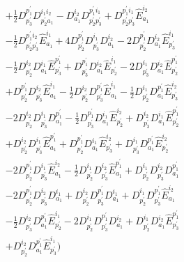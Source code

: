 \documentclass[aip,onecolumn,preprint]{revtex4-1}
\begin{document}
\begin{align}
  & + {{{\frac{1}{2}}}{D^{{p^{\prime}_1}}_{{p^{\prime}_3}}}{D^{{i_1}{i_2}}_{{p^{\prime}_2}{a_1}}}} - {{D^{{i_2}}_{{a_1}}}{D^{{p^{\prime}_1}{i_1}}_{{p^{\prime}_2}{p^{\prime}_3}}}} + {{D^{{p^{\prime}_1}{i_1}}_{{p^{\prime}_2}{p^{\prime}_3}}}{\hat{E}^{{i_2}}_{{a_1}}}} \nonumber \\
  & - {{{\frac{1}{2}}}{D^{{p^{\prime}_1}{i_2}}_{{p^{\prime}_2}{p^{\prime}_3}}}{\hat{E}^{{i_1}}_{{a_1}}}} + {{{4}}{D^{{p^{\prime}_1}}_{{p^{\prime}_2}}}{D^{{i_1}}_{{p^{\prime}_3}}}{D^{{i_2}}_{{a_1}}}} - {{{2}}{D^{{p^{\prime}_1}}_{{p^{\prime}_2}}}{D^{{i_2}}_{{a_1}}}{\hat{E}^{{i_1}}_{{p^{\prime}_3}}}} \nonumber \\
  & - {{{\frac{1}{2}}}{D^{{i_2}}_{{p^{\prime}_2}}}{D^{{i_1}}_{{a_1}}}{\hat{E}^{{p^{\prime}_1}}_{{p^{\prime}_3}}}}  + {{D^{{p^{\prime}_1}}_{{p^{\prime}_3}}}{D^{{i_2}}_{{a_1}}}{\hat{E}^{{i_1}}_{{p^{\prime}_2}}}} - {{{2}}{D^{{i_1}}_{{p^{\prime}_3}}}{D^{{i_2}}_{{a_1}}}{\hat{E}^{{p^{\prime}_1}}_{{p^{\prime}_2}}}} \nonumber \\
  & + {{D^{{p^{\prime}_1}}_{{p^{\prime}_2}}}{D^{{i_2}}_{{p^{\prime}_3}}}{\hat{E}^{{i_1}}_{{a_1}}}} - {{{\frac{1}{2}}}{D^{{i_2}}_{{p^{\prime}_2}}}{D^{{p^{\prime}_1}}_{{p^{\prime}_3}}}{\hat{E}^{{i_1}}_{{a_1}}}} - {{{\frac{1}{2}}}{D^{{i_1}}_{{p^{\prime}_2}}}{D^{{p^{\prime}_1}}_{{a_1}}}{\hat{E}^{{i_2}}_{{p^{\prime}_3}}}} \nonumber \\
  & - {{{2}}{D^{{i_2}}_{{p^{\prime}_2}}}{D^{{i_1}}_{{p^{\prime}_3}}}{D^{{p^{\prime}_1}}_{{a_1}}}} - {{{\frac{1}{2}}}{D^{{p^{\prime}_1}}_{{p^{\prime}_3}}}{D^{{i_1}}_{{a_1}}}{\hat{E}^{{i_2}}_{{p^{\prime}_2}}}} + {{D^{{i_2}}_{{p^{\prime}_3}}}{D^{{i_1}}_{{a_1}}}{\hat{E}^{{p^{\prime}_1}}_{{p^{\prime}_2}}}} \nonumber \\
  & + {{D^{{i_2}}_{{p^{\prime}_2}}}{D^{{i_1}}_{{p^{\prime}_3}}}{\hat{E}^{{p^{\prime}_1}}_{{a_1}}}} + {{D^{{p^{\prime}_1}}_{{p^{\prime}_2}}}{D^{{i_1}}_{{a_1}}}{\hat{E}^{{i_2}}_{{p^{\prime}_3}}}} + {{D^{{i_1}}_{{p^{\prime}_3}}}{D^{{p^{\prime}_1}}_{{a_1}}}{\hat{E}^{{i_2}}_{{p^{\prime}_2}}}} \nonumber \\
  & - {{{2}}{D^{{p^{\prime}_1}}_{{p^{\prime}_2}}}{D^{{i_1}}_{{p^{\prime}_3}}}{\hat{E}^{{i_2}}_{{a_1}}}} - {{{\frac{1}{2}}}{D^{{i_1}}_{{p^{\prime}_2}}}{D^{{i_2}}_{{p^{\prime}_3}}}{\hat{E}^{{p^{\prime}_1}}_{{a_1}}}} + {{D^{{i_1}}_{{p^{\prime}_2}}}{D^{{i_2}}_{{p^{\prime}_3}}}{D^{{p^{\prime}_1}}_{{a_1}}}} \nonumber \\
  & - {{{2}}{D^{{p^{\prime}_1}}_{{p^{\prime}_2}}}{D^{{i_2}}_{{p^{\prime}_3}}}{D^{{i_1}}_{{a_1}}}} + {{D^{{i_2}}_{{p^{\prime}_2}}}{D^{{p^{\prime}_1}}_{{p^{\prime}_3}}}{D^{{i_1}}_{{a_1}}}} + {{D^{{i_1}}_{{p^{\prime}_2}}}{D^{{p^{\prime}_1}}_{{p^{\prime}_3}}}{\hat{E}^{{i_2}}_{{a_1}}}} \nonumber \\
  & - {{{\frac{1}{2}}}{D^{{i_2}}_{{p^{\prime}_3}}}{D^{{p^{\prime}_1}}_{{a_1}}}{\hat{E}^{{i_1}}_{{p^{\prime}_2}}}} - {{{2}}{D^{{i_1}}_{{p^{\prime}_2}}}{D^{{p^{\prime}_1}}_{{p^{\prime}_3}}}{D^{{i_2}}_{{a_1}}}} + {{D^{{i_1}}_{{p^{\prime}_2}}}{D^{{i_2}}_{{a_1}}}{\hat{E}^{{p^{\prime}_1}}_{{p^{\prime}_3}}}} \nonumber \\
  & + {{D^{{i_2}}_{{p^{\prime}_2}}}{D^{{p^{\prime}_1}}_{{a_1}}}{\hat{E}^{{i_1}}_{{p^{\prime}_3}}}}\bigg)
  \end{align}
\end{document}
